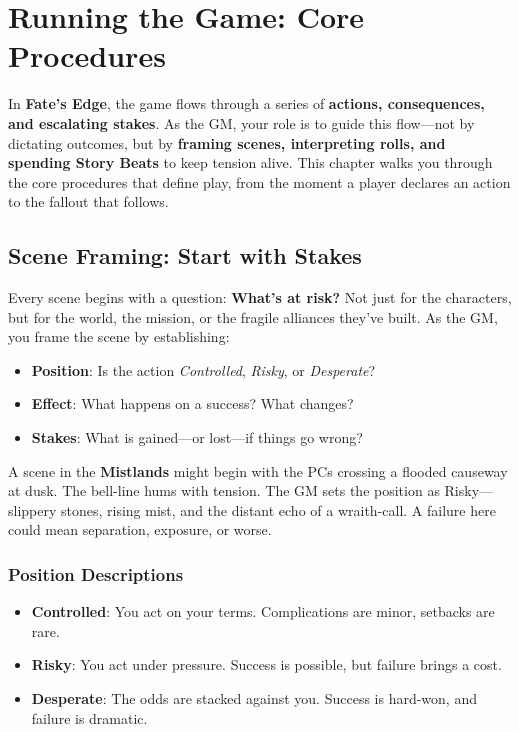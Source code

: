 \chapter{Running the Game: Core Procedures}

In \textbf{Fate's Edge}, the game flows through a series of \textbf{actions, consequences, and escalating stakes}. As the GM, your role is to guide this flow---not by dictating outcomes, but by \textbf{framing scenes, interpreting rolls, and spending Story Beats} to keep tension alive. This chapter walks you through the core procedures that define play, from the moment a player declares an action to the fallout that follows.

\section{Scene Framing: Start with Stakes}

Every scene begins with a question: \textbf{What's at risk?} Not just for the characters, but for the world, the mission, or the fragile alliances they've built. As the GM, you frame the scene by establishing:

\begin{itemize}
    \item \textbf{Position}: Is the action \textit{Controlled}, \textit{Risky}, or \textit{Desperate}?
    \item \textbf{Effect}: What happens on a success? What changes?
    \item \textbf{Stakes}: What is gained---or lost---if things go wrong?
\end{itemize}

A scene in the \textbf{Mistlands} might begin with the PCs crossing a flooded causeway at dusk. The bell-line hums with tension. The GM sets the position as Risky---slippery stones, rising mist, and the distant echo of a wraith-call. A failure here could mean separation, exposure, or worse.

\subsection{Position Descriptions}

\begin{itemize}
    \item \textbf{Controlled}: You act on your terms. Complications are minor, setbacks are rare.
    \item \textbf{Risky}: You act under pressure. Success is possible, but failure brings a cost.
    \item \textbf{Desperate}: The odds are stacked against you. Success is hard-won, and failure is dramatic.
\end{itemize}

